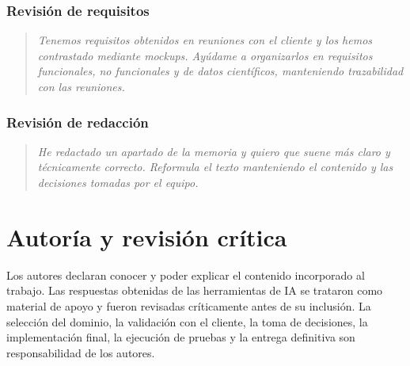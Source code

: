 \subsubsection*{Revisión de requisitos}
\begin{quote}
\textit{Tenemos requisitos obtenidos en reuniones con el cliente y los hemos
contrastado mediante mockups. Ayúdame a organizarlos en requisitos funcionales, no
funcionales y de datos científicos, manteniendo trazabilidad con las reuniones.}
\end{quote}

\subsubsection*{Revisión de redacción}
\begin{quote}
\textit{He redactado un apartado de la memoria y quiero que suene más claro y
técnicamente correcto. Reformula el texto manteniendo el contenido y las decisiones
tomadas por el equipo.}
\end{quote}

\section{Autoría y revisión crítica}

Los autores declaran conocer y poder explicar el contenido incorporado al trabajo.
Las respuestas obtenidas de las herramientas de IA se trataron como material de
apoyo y fueron revisadas críticamente antes de su inclusión. La selección del
dominio, la validación con el cliente, la toma de decisiones, la implementación
final, la ejecución de pruebas y la entrega definitiva son responsabilidad de los
autores.

